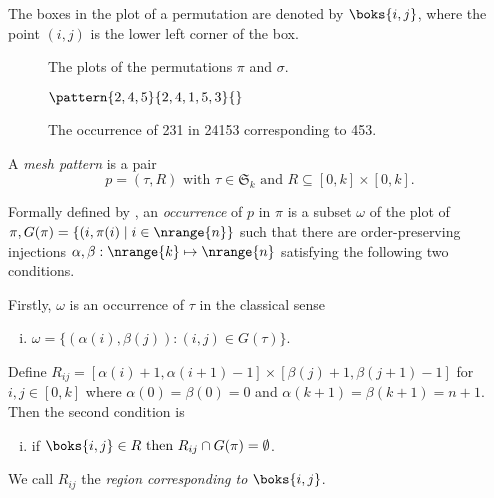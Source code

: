 The boxes in the plot of a permutation are denoted by \(\boks{i,j}\), where the
point \((i,j)\) is the lower left corner of the box.

\begin{figure}[htb]
    \begin{center}
    \raisebox{6ex}{\(G(\pi)=\)}

        \caption{The plots of the permutations \(\pi\) and \(\sigma\).}
        \label{fig:plots}
    \end{center}
\end{figure}

\begin{figure}[htb]
    \begin{center}
    \(\pattern{2,4,5}{2,4,1,5,3}{}\)
        \caption{The occurrence of 231 in 24153 corresponding to 453.}
        \label{fig:containment}
    \end{center}
\end{figure}

\begin{definition}
A \emph{mesh pattern} is a pair
\begin{equation*}
    p = (\tau,R)\text{ with } \tau \in \mathfrak{S}_k \text{ and } R \subseteq [0,k]\times [0,k].
\end{equation*}
\end{definition}

Formally defined by \textcite{journals/combinatorics/BrandenC11}, an
\emph{occurrence} of \(p\) in \(\pi\) is a subset \(\omega\) of the plot of
\(\pi, G(\pi) = \{(i,\pi(i)\mid i\in\nrange{n}\}\) such that there are
order-preserving injections \(\alpha,\beta:\nrange{k}\mapsto\nrange{n}\)
satisfying the following two conditions.

Firstly, \(\omega\) is an occurrence of \(\tau\) in the classical sense
  \begin{enumerate}[i.]
    \item \(\omega = \{(\alpha(i),\beta(j)):(i,j)\in G(\tau)\}\).
  \end{enumerate}\saveenum
  Define \(R_{ij} = [\alpha(i)+1,\alpha(i+1)-1]\times[\beta(j)+1,\beta(j+1)-1]\)
   for \(i,j\in[0,k]\) where \(\alpha(0)=\beta(0)=0\) and \(\alpha(k+1)=\beta(k+1)=n+1\). Then
   the second condition is
  \begin{enumerate}[i.]\resetenum
  \item if \(\boks{i,j} \in R \text{ then } R_{ij} \cap G(\pi) = \emptyset\).
\end{enumerate}
We call \(R_{ij}\) the \emph{region corresponding to} \(\boks{i,j}\).

